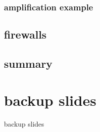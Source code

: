 \subsubsection{amplification example}

\subsection{firewalls} %


\subsection{summary}


\section{backup slides}
\begin{frame}{backup slides}
\end{frame}
